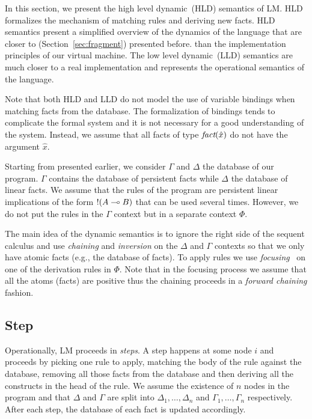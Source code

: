
In this section, we present the high level dynamic~(HLD) semantics of LM.  HLD
formalizes the mechanism of matching rules and deriving new facts.  HLD
semantics present a simplified overview of the dynamics of the language that are
closer to \fragment (Section~\ref{sec:fragment}) presented before.  than the
implementation principles of our virtual machine. The low level dynamic~(LLD)
semantics are much closer to a real implementation and represents the
operational semantics of the language.

Note that both HLD and LLD do not model the use of variable bindings when
matching facts from the database. The formalization of bindings tends to
complicate the formal system and it is not necessary for a good understanding of
the system. Instead, we assume that all facts of type $\emph{fact}(\hat{x})$ do
not have the argument $\hat{x}$.

Starting from \fragment presented earlier, we consider $\Gamma$ and $\Delta$ the database
of our program. $\Gamma$ contains the database of persistent facts while $\Delta$ the database of linear
facts. We assume that the rules of the program are persistent linear implications of the form
${!} (A \multimap B)$ that can be used several times. However, we do not put the rules in the $\Gamma$
context but in a separate context $\Phi$.

The main idea of the dynamic semantics is to ignore the right side of the
sequent calculus and use \emph{chaining} and \emph{inversion} on the $\Delta$
and $\Gamma$ contexts so that we only have atomic facts (e.g., the database of
facts).  To apply rules we use
\emph{focusing}~\cite{Andreoli92logicprogramming} on one of the derivation rules
in $\Phi$. Note that in the focusing process we assume that all the atoms
(facts) are positive thus the chaining proceeds in a \emph{forward chaining}
fashion.

\subsection{Step}\label{sec:step_hld}

Operationally, LM proceeds in \emph{steps}. A step happens at some node $i$ and
proceeds by picking one rule to apply, matching the body of the rule against the
database, removing all those facts from the database and then deriving all the
constructs in the head of the rule. We assume the existence of $n$ nodes in the
program and that $\Delta$ and $\Gamma$ are split into $\Delta_1, \dotsc, \Delta_n$
and $\Gamma_1, \dotsc, \Gamma_n$ respectively. After each step, the database of
each fact is updated accordingly.

